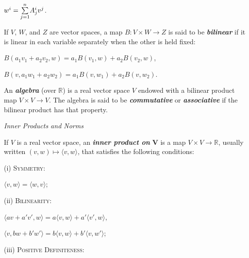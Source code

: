 \documentclass[12pt, a4paper]{article}
\begin{document}
\vspace{4mm}

\centerline{$w^i=\large{\sum\limits_{j=1}^{n}} A^i_jv^j$.}

\vspace{4mm}

If $V$, $W$, and $Z$ are vector spaces, a map $B\colon V\times W\rightarrow Z$ is said to be \textit{\textbf{bilinear}} if it is linear in each variable separately when the other is held fixed:\par

\vspace{4mm}

\centerline{$B(a_1v_1+a_2v_2, w)=a_1B(v_1, w)+a_2B(v_2, w)$,}
\vspace{2mm}
\centerline{$B(v, a_1w_1+a_2w_2)=a_1B(v, w_1)+a_2B(v, w_2)$.}

\vspace{4mm}

An \textit{\textbf{algebra}} (over $\mathbb{R}$) is a real vector space $V$ endowed with a bilinear product map $V\times V\rightarrow V$. The algebra is said to be \textit{\textbf{commutative}} or \textit{\textbf{associative}} if the bilinear product has that property.

\vspace{4mm}

\begin{flushleft}
\textit{\large{Inner Products and Norms}}
\end{flushleft}

If $V$ is a real vector space, an \textit{\textbf{inner product on}} $\bm{V}$ is a map $V\times V\rightarrow\mathbb{R}$, usually written $(v, w)\mapsto \langle v, w\rangle$, that satisfies the following conditions:\par

\vspace{4mm}

(i) \textsc{Symmetry}:\par
\centerline{$\langle v, w \rangle= \langle w, v \rangle$;}

(ii) \textsc{Bilinearity}:\par
\centerline{$\langle av+a'v', w\rangle=a\langle v, w\rangle+a'\langle v', w\rangle$,}
\vspace{2mm}
\centerline{$\langle v, bw+b'w'\rangle=b\langle v, w\rangle+b'\langle v, w'\rangle$;}

\vspace{4mm}

(iii) \textsc{Positive Definiteness}:\par
\end{document}
